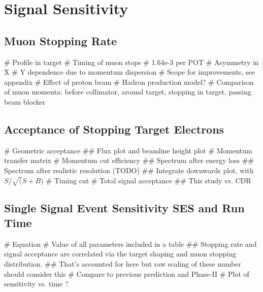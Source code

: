 
\chapter{\phaseII Signal Sensitivity}
\FigSensMuStopsTwoD
\section{Muon Stopping Rate}
\begin{easylist}
# Profile in target
# Timing of muon stops
# 1.64e-3 per POT
# Asymmetry in X
# Y dependence due to momentum dispersion
# Scope for improvements, see appendix
# Effect of proton beam
# Hadron production model?
# Comparison of muon momenta: before collimator, around target, stopping in target, passing beam blocker
\end{easylist}

\section{Acceptance of Stopping Target Electrons}
\FigSensGeomAccept
\FigSensMomTransfer
\FigSensMomSpectra
\FigSensMomIntegral
\FigSensTiming
\begin{easylist}
# Geometric acceptance
## Flux plot and beamline height plot
# Momentum transfer matrix
# Momentum cut efficiency
## Spectrum after energy loss
## Spectrum after realistic resolution (TODO)
## Integrate downwards plot, with $S/\sqrt(S+B)$
# Timing cut
# Total signal acceptance
## This study vs. CDR
\end{easylist}

\section{Single Signal Event Sensitivity \acs{SES} and Run Time}
\begin{easylist}
# Equation
# Value of all parameters included in a table
## Stopping rate and signal acceptance are correlated via the target shaping and muon stopping distribution.
## That's accounted for here but raw scaling of these number should consider this
# Compare to previous prediction and Phase-II
# Plot of sensitivity vs. time ?
\end{easylist}
